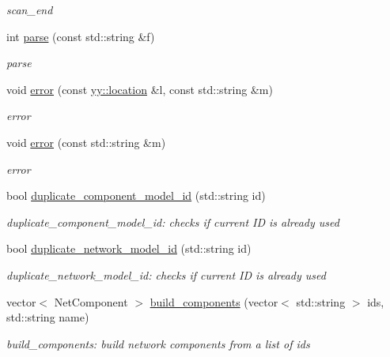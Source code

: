 \begin{DoxyCompactItemize}
\begin{DoxyCompactList}\small\item\em scan\+\_\+end \end{DoxyCompactList}\item 
int \hyperlink{classspec__driver_aa046696e40b60102725e627b42521c32}{parse} (const std\+::string \&f)
\begin{DoxyCompactList}\small\item\em parse \end{DoxyCompactList}\item 
void \hyperlink{classspec__driver_a26346ffb6356f1d39658b9200599c5cc}{error} (const \hyperlink{classyy_1_1location}{yy\+::location} \&l, const std\+::string \&m)
\begin{DoxyCompactList}\small\item\em error \end{DoxyCompactList}\item 
void \hyperlink{classspec__driver_a1cee1cf6c4bdb30e6ffde06806807aef}{error} (const std\+::string \&m)
\begin{DoxyCompactList}\small\item\em error \end{DoxyCompactList}\item 
bool \hyperlink{classspec__driver_ad85b6046a06158cf786164b763b47beb}{duplicate\+\_\+component\+\_\+model\+\_\+id} (std\+::string id)
\begin{DoxyCompactList}\small\item\em duplicate\+\_\+component\+\_\+model\+\_\+id\+: checks if current ID is already used \end{DoxyCompactList}\item 
bool \hyperlink{classspec__driver_a794189e9d2f75a0f30b6ac8e1616c14d}{duplicate\+\_\+network\+\_\+model\+\_\+id} (std\+::string id)
\begin{DoxyCompactList}\small\item\em duplicate\+\_\+network\+\_\+model\+\_\+id\+: checks if current ID is already used \end{DoxyCompactList}\item 
vector$<$ Net\+Component $>$ \hyperlink{classspec__driver_aae557c73a2e1ae2d919ca291442c9729}{build\+\_\+components} (vector$<$ std\+::string $>$ ids, std\+::string name)
\begin{DoxyCompactList}\small\item\em build\+\_\+components\+: build network components from a list of ids \end{DoxyCompactList}\item 

\end{DoxyCompactItemize}
